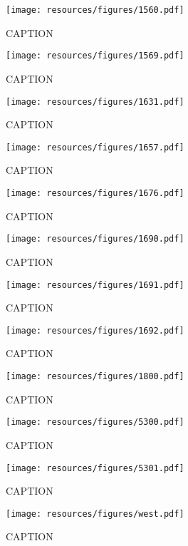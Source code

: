 \begin{figure}[H]
\texttt{[image: resources/figures/1560.pdf]}
\caption{CAPTION}
\label{fig:appendix_1560}
\end{figure}

\begin{figure}[H]
\texttt{[image: resources/figures/1569.pdf]}
\caption{CAPTION}
\label{fig:appendix_1569}
\end{figure}

\begin{figure}[H]
\texttt{[image: resources/figures/1631.pdf]}
\caption{CAPTION}
\label{fig:appendix_1631}
\end{figure}

\begin{figure}[H]
\texttt{[image: resources/figures/1657.pdf]}
\caption{CAPTION}
\label{fig:appendix_1657}
\end{figure}

\begin{figure}[H]
\texttt{[image: resources/figures/1676.pdf]}
\caption{CAPTION}
\label{fig:appendix_1676}
\end{figure}

\begin{figure}[H]
\texttt{[image: resources/figures/1690.pdf]}
\caption{CAPTION}
\label{fig:appendix_1690}
\end{figure}

\begin{figure}[H]
\texttt{[image: resources/figures/1691.pdf]}
\caption{CAPTION}
\label{fig:appendix_1691}
\end{figure}

\begin{figure}[H]
\texttt{[image: resources/figures/1692.pdf]}
\caption{CAPTION}
\label{fig:appendix_1692}
\end{figure}

\begin{figure}[H]
\texttt{[image: resources/figures/1800.pdf]}
\caption{CAPTION}
\label{fig:appendix_1800}
\end{figure}

\begin{figure}[H]
\texttt{[image: resources/figures/5300.pdf]}
\caption{CAPTION}
\label{fig:appendix_5300}
\end{figure}

\begin{figure}[H]
\texttt{[image: resources/figures/5301.pdf]}
\caption{CAPTION}
\label{fig:appendix_5301}
\end{figure}

\begin{figure}[H]
\texttt{[image: resources/figures/west.pdf]}
\caption{CAPTION}
\label{fig:appendix_west}
\end{figure}
